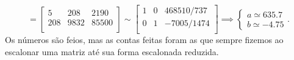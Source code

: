 \begin{ex}
  \begin{equation}
  [\, A^TA \ | \ \vec{b} \, ] =
  \begin{bmatrix}
    5    & 208 & 2190 \\
    208  & 9832 & 85500 \\
  \end{bmatrix} \sim
  \begin{bmatrix}
    1 & 0 & 468510/737 \\
    0 & 1 & -7005/1474 \\
  \end{bmatrix} \implies
  \left\{
    \begin{array}{ll}
      a \simeq 635.7 \\
      b \simeq -4.75
    \end{array}
  \right..
  \end{equation} Os números são feios, mas as contas feitas foram as que sempre fizemos ao escalonar uma matriz até sua forma escalonada reduzida.


\end{ex}
